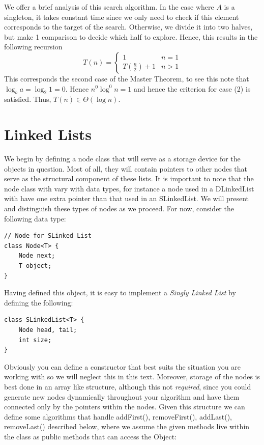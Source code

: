 \documentclass[9pt]{article} %
\begin{document}
	We offer a brief analysis of this search algorithm. In the case where $A$ is a singleton, it takes constant time since we only need to check if this element corresponds to the target of the search. Otherwise, we divide it into two halves, but make 1 comparison to decide which half to explore. Hence, this results in the following recursion
	$$	
		T(n) = \begin{cases} 1 & n =1 \\ T \left( \frac{n}{2} \right)+ 1 & n > 1\end{cases}
	$$
	This corresponds the second case of the Master Theorem, to see this note that $\log_b{a} = \log_2{1} = 0$. Hence $n^0 \log^0{n} = 1$ and hence the criterion for case (2) is satisfied. Thus, $T(n) \in \Theta(\log{n})$.
	\section{\large Linked Lists}
	
	We begin by defining a node class that will serve as a storage device for the objects in question. Most of all, they will contain pointers to other nodes that serve as the structural component of these lists. It is important to note that the node class with vary with data types, for instance a node used in a DLinkedList with have one extra pointer than that used in an SLinkedList. We will present and distinguish these types of nodes as we proceed. For now, consider the following data type:
	\label{node_slist}
	\begin{lstlisting}
// Node for SLinked List
class Node<T> {
	Node next;
	T object;
}
\end{lstlisting}

Having defined this object, it is easy to implement a \emph{Singly Linked List} by defining the following:
\begin{lstlisting}
class SLinkedList<T> {
	Node head, tail;
	int size;
}
\end{lstlisting}
Obviously you can define a constructor that best suits the situation you are working with so we will neglect this in this text. Moreover, storage of the nodes is best done in an array like structure, although this not \emph{required}, since you could generate new nodes dynamically throughout your algorithm and have them connected only by the pointers within the nodes. Given this structure we can define some algorithms that handle addFirst(), removeFirst(), addLast(), removeLast() described below, where we assume the given methods live within the class as public methods that can access the Object:
\end{document}
